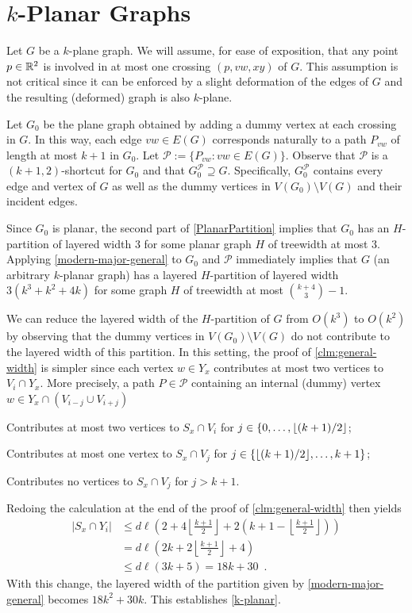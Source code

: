 \documentclass{patmorin}
\DeclarePairedDelimiter{\floor}{\lfloor}{\rfloor}
\newcommand{\PP}{\mathcal{P}}
\renewcommand{\le}{\leqslant}
\begin{document}
\section{\boldmath $k$-Planar Graphs}
\label{sec-k-planar}

Let $G$ be a $k$-plane graph.  We will assume, for ease of exposition, that any point $p\in\mathbb{R}^2$ is involved in at most one crossing $(p,vw,xy)$ of $G$. This assumption is not critical since it can be enforced by a slight deformation of the edges of $G$ and the resulting (deformed) graph is also $k$-plane.  

Let $G_0$ be the plane graph obtained by adding a dummy vertex at each crossing in $G$. In this way, each edge $vw\in E(G)$ corresponds naturally to a path $P_{vw}$ of length at most $k+1$ in $G_0$.  Let $\PP := \{P_{vw}: vw\in E(G)\}$. Observe that $\PP$ is a $(k+1,2)$-shortcut for $G_0$ and that $G_0^{\mathcal{P}}\supseteq G$.  Specifically, $G_0^{\mathcal{P}}$ contains every edge and vertex of $G$ as well as the dummy vertices in $V(G_0)\setminus V(G)$ and their incident edges.  

Since $G_0$ is planar, the second part of \cref{PlanarPartition} implies that $G_0$ has an $H$-partition of layered width 3 for some planar graph $H$ of treewidth at most 3.  Applying \cref{modern-major-general} to $G_0$ and $\mathcal{P}$ immediately implies that $G$ (an arbitrary $k$-planar graph) has a layered $H$-partition of layered width $3(k^3+k^2+4k)$ for some graph $H$ of treewidth at most $\binom{k+4}{3}-1$.

We can reduce the layered width of the $H$-partition of $G$ from $O(k^3)$ to $O(k^2)$ by observing that the dummy vertices in $V(G_0)\setminus V(G)$ do not contribute to the layered width of this partition.  In this setting, the proof of \cref{clm:general-width} is simpler since each vertex $w\in Y_x$ contributes at most two vertices to $V_i\cap Y_x$.  More precisely, a path $P\in\mathcal{P}$ containing an internal (dummy) vertex $w\in Y_x\cap (V_{i-j}\cup V_{i+j})$
\begin{compactenum}
  \item Contributes at most two vertices to $S_x\cap V_i$ for $j\in\{0,\ldots,\floor{(k+1)/2}$;
  \item Contributes at most one vertex to $S_x\cap V_j$ for $j\in\{\floor{(k+1)/2},\ldots,k+1\}$; 
  \item Contributes no vertices to $S_x\cap V_j$ for $j > k+1$.
\end{compactenum}
Redoing the calculation at the end of the proof of \cref{clm:general-width} then yields 
\begin{align*}
    |S_x\cap Y_i| &\le d\ell\left( 
       2 
       + 4\left\lfloor\frac{k+1}{2}\right\rfloor 
       + 2\left(k+1-\left\lfloor\frac{k+1}{2}\right\rfloor\right)
       \right)\\
       & =
       d\ell\left(
         2k + 2\left\lfloor\frac{k+1}{2}\right\rfloor + 4
       \right) \\
       & \le
       d\ell(3k+5) = 18k+30 \enspace .
\end{align*}    
With this change, the layered width of the partition given by \cref{modern-major-general} becomes $18k^2+30k$.  This establishes \cref{k-planar}.
\end{document}
